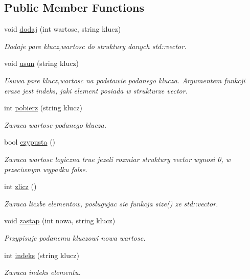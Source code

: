 \subsection*{\-Public \-Member \-Functions}
\begin{DoxyCompactItemize}
\item 
void \hyperlink{class_asc_ab61fca727baefdc1bdc43b6934a9891d}{dodaj} (int wartosc, string klucz)
\begin{DoxyCompactList}\small\item\em \-Dodaje pare klucz,wartosc do struktury danych std\-::vector. \end{DoxyCompactList}\item 
void \hyperlink{class_asc_a1e6c884267c2cd16658fb579974e5836}{usun} (string klucz)
\begin{DoxyCompactList}\small\item\em \-Usuwa pare klucz,wartosc na podstawie podanego klucza. \-Argumentem funkcji erase jest indeks, jaki element posiada w strukturze vector. \end{DoxyCompactList}\item 
int \hyperlink{class_asc_ad1d5afbc2bab5ddcddaf5f9330c16e91}{pobierz} (string klucz)
\begin{DoxyCompactList}\small\item\em \-Zwraca wartosc podanego klucza. \end{DoxyCompactList}\item 
bool \hyperlink{class_asc_aef12f2bec43a87b241551ddb19c06ecd}{czypusta} ()
\begin{DoxyCompactList}\small\item\em \-Zwraca wartosc logiczna true jezeli rozmiar struktury vector wynosi 0, w przeciwnym wypadku false. \end{DoxyCompactList}\item 
int \hyperlink{class_asc_a45687a815410ce5ade4b7add6b264543}{zlicz} ()
\begin{DoxyCompactList}\small\item\em \-Zwraca liczbe elementow, poslugujac sie funkcja size() ze std\-::vector. \end{DoxyCompactList}\item 
void \hyperlink{class_asc_a09837df81add84668e2df9534a9ba019}{zastap} (int nowa, string klucz)
\begin{DoxyCompactList}\small\item\em \-Przypisuje podanemu kluczowi nowa wartosc. \end{DoxyCompactList}\item 
int \hyperlink{class_asc_aa6a29148b2e17fa303da21e8975c7f4f}{indeks} (string klucz)
\begin{DoxyCompactList}\small\item\em \-Zwraca indeks elementu. \end{DoxyCompactList}\end{DoxyCompactItemize}
